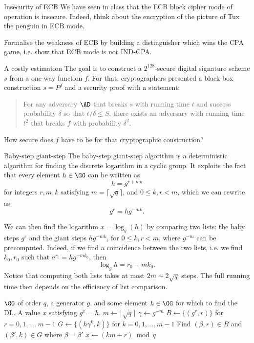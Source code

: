 \documentclass{practice}
\begin{document}
\begin{task}{Insecurity of ECB}
  We have seen in class that the ECB block cipher mode of operation is insecure.
  Indeed, think about the encryption of the picture of Tux the penguin in ECB mode.

  Formalise the weakness of ECB by building a distinguisher which wins the CPA game, i.e. show that ECB mode is not IND-CPA.
\end{task}

\begin{task}{A costly estimation}
  The goal is to construct a $2^{128}$-secure digital signature scheme $s$ from a one-way function $f$.
  For that, cryptographers presented a black-box construction $s=P^f$ and a security proof with a statement:
  \begin{quote}
    For any adversary $\AD$ that breaks $s$ with running time $t$ and success probability $\delta$ so that $t/\delta\le S$, there exists an adversary with running time $t^2$ that breaks $f$ with probability $\delta^2$.
  \end{quote}
  How secure does $f$ have to be for that cryptographic construction?
\end{task}

\begin{task}{Baby-step giant-step}
  The baby-step giant-step algorithm is a deterministic algorithm for finding the discrete logarithm in a cyclic group.
  It exploits the fact that every element $h \in \GG$ can be written as
  \[
    h = g^{r + mk}
  \]
  for integers $r, m, k$ satisfying $m = \bigl\lceil\sqrt{q}\bigr\rceil$, and $0 \le k, r < m$, which we can rewrite as
  \[
    g^{r} = hg^{-mk}.
  \]

  We can then find the logarithm $x = \log_g(h)$ by comparing two lists: the baby steps $g^r$ and the giant steps $hg^{-mk}$, for $0 \le k, r < m$, where $g^{-m}$ can be precomputed.
  Indeed, if we find a coincidence between the two lists, i.e. we find $k_0, r_0$ such that $a^{r_0} = hg^{-mk_0}$, then
  \[
    \log_g{h} = r_0 + mk_0.
  \]
  Notice that computing both lists takes at most $2m \sim 2 \sqrt{q}$ steps.
  The full running time then depends on the efficiency of list comparison.

  \renewcommand{\algorithmicrequire}{\textbf{Input:}}
  \renewcommand{\algorithmicensure}{\textbf{Output:}}
  \begin{algorithm}
    \caption{Baby-step giant-step (BSGS) algorithm}\label{alg:cap}
  \begin{algorithmic}[1]
    \Require $\GG$ of order $q$, a generator $g$, and some element $h\in\GG$ for which to find the DL.
    \Ensure A value $x$ satisfying $g^x = h$.
    \State $m \gets \bigl\lceil \sqrt{q}\bigr\rceil$
    \State $\gamma \gets g^{-m}$
    \State $B \gets \{(g^r,r)\}$ for $r = 0, 1, \dots, m - 1$
    \State $G \gets \{(h\gamma^k,k)\}$ for $k = 0, 1, \dots, m - 1$
    \State Find $(\beta, r)\in B$ and $(\beta', k)\in G$ where $\beta = \beta'$
    \State $x \gets (km + r) \bmod q$
    \State {}
  \end{algorithmic}
  \end{algorithm}
\end{task}
\end{document}
